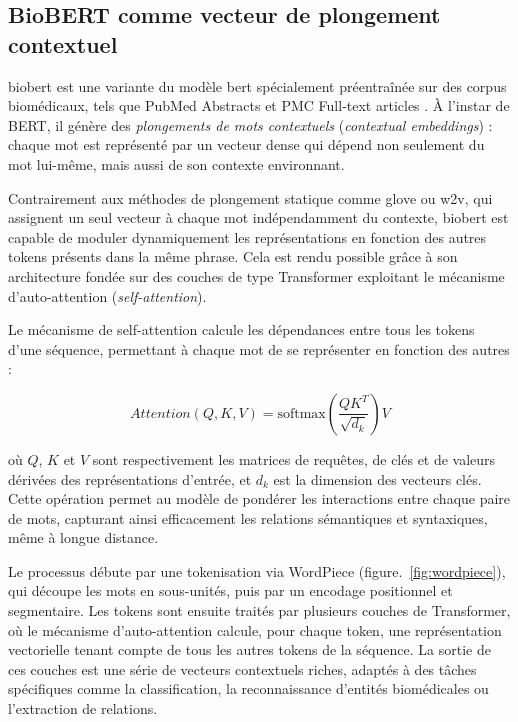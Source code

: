 \documentclass[12pt]{report}
\begin{document}
\subsection{BioBERT comme vecteur de plongement contextuel}

\gls{biobert} est une variante du modèle \gls{bert} spécialement préentraînée sur des corpus biomédicaux, tels que PubMed Abstracts et PMC Full-text articles \cite{lee2020biobert}. À l’instar de BERT, il génère des \textit{plongements de mots contextuels} (\textit{contextual embeddings}) : chaque mot est représenté par un vecteur dense qui dépend non seulement du mot lui-même, mais aussi de son contexte environnant.

Contrairement aux méthodes de plongement statique comme \gls{glove} ou \gls{w2v}, qui assignent un seul vecteur à chaque mot indépendamment du contexte, \gls{biobert} est capable de moduler dynamiquement les représentations en fonction des autres tokens présents dans la même phrase. Cela est rendu possible grâce à son architecture fondée sur des couches de type Transformer exploitant le mécanisme d’auto-attention (\textit{self-attention}).

Le mécanisme de self-attention calcule les dépendances entre tous les tokens d’une séquence, permettant à chaque mot de se représenter en fonction des autres :

\begin{equation}
\textit{Attention}(Q, K, V) = \text{softmax} \left( \frac{QK^{T}}{\sqrt{d_k}} \right) V
\end{equation}

où $Q$, $K$ et $V$ sont respectivement les matrices de requêtes, de clés et de valeurs dérivées des représentations d’entrée, et $d_k$ est la dimension des vecteurs clés. Cette opération permet au modèle de pondérer les interactions entre chaque paire de mots, capturant ainsi efficacement les relations sémantiques et syntaxiques, même à longue distance.

Le processus débute par une tokenisation via WordPiece (figure.~\ref{fig:wordpiece}), qui découpe les mots en sous-unités, puis par un encodage positionnel et segmentaire. Les tokens sont ensuite traités par plusieurs couches de Transformer, où le mécanisme d’auto-attention calcule, pour chaque token, une représentation vectorielle tenant compte de tous les autres tokens de la séquence. La sortie de ces couches est une série de vecteurs contextuels riches, adaptés à des tâches spécifiques comme la classification, la reconnaissance d’entités biomédicales ou l’extraction de relations.
\end{document}
